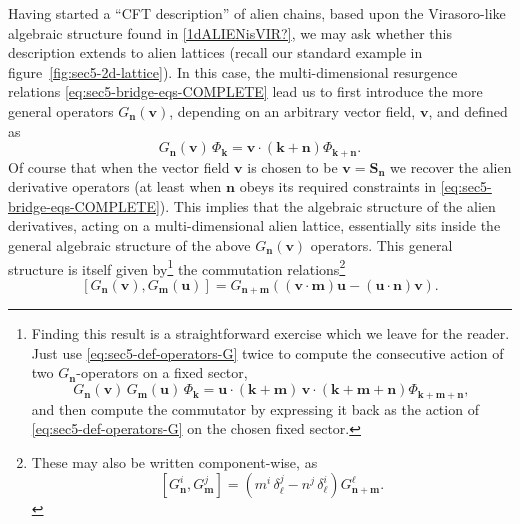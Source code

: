 \documentclass[11pt,a4paper]{article}
\newcommand{\be}{\begin{equation}}
\newcommand{\ee}{\end{equation}}
\begin{document}
Having started a ``CFT description'' of alien chains, based upon the Virasoro-like algebraic structure found in \eqref{1dALIENisVIR?}, we may ask whether this description extends to alien lattices (recall our standard example in figure~\ref{fig:sec5-2d-lattice}). In this case, the multi-dimensional resurgence relations \eqref{eq:sec5-bridge-eqs-COMPLETE} lead us to first introduce the more general operators $G_{\boldsymbol{n}} (\boldsymbol{v})$, depending on an arbitrary vector field, $\boldsymbol{v}$, and defined as
%
\be
\label{eq:sec5-def-operators-G}
G_{\boldsymbol{n}} (\boldsymbol{v})\, \Phi_{\boldsymbol{k}} = \boldsymbol{v} \cdot  \left( \boldsymbol{k}+\boldsymbol{n} \right) \Phi_{\boldsymbol{k}+\boldsymbol{n}}.
\ee
%
\noindent
Of course that when the vector field $\boldsymbol{v}$ is chosen to be $\boldsymbol{v} = \boldsymbol{S}_{\boldsymbol{n}}$ we recover the alien derivative operators (at least when $\boldsymbol{n}$ obeys its required constraints in \eqref{eq:sec5-bridge-eqs-COMPLETE}). This implies that the algebraic structure of the alien derivatives, acting on a multi-dimensional alien lattice, essentially sits inside the general algebraic structure of the above $G_{\boldsymbol{n}} (\boldsymbol{v})$ operators. This general structure is itself given by\footnote{Finding this result is a straightforward exercise which we leave for the reader. Just use \eqref{eq:sec5-def-operators-G} twice to compute the consecutive action of two $G_{\boldsymbol{n}}$-operators on a fixed sector,
%
\be
G_{\boldsymbol{n}} (\boldsymbol{v})\, G_{\boldsymbol{m}} (\boldsymbol{u})\, \Phi_{\boldsymbol{k}} = \boldsymbol{u} \cdot \left( \boldsymbol{k} + \boldsymbol{m} \right)\, \boldsymbol{v} \cdot \left( \boldsymbol{k} + \boldsymbol{m} + \boldsymbol{n} \right) \Phi_{\boldsymbol{k}+\boldsymbol{m}+\boldsymbol{n}},
\ee
%
\noindent
and then compute the commutator by expressing it back as the action of \eqref{eq:sec5-def-operators-G} on the chosen fixed sector.} the commutation relations\footnote{These may also be written component-wise, as
%
\be
\label{multi-dim-alien-chain-ALG-COMPONENTS}
\left[ G_{\boldsymbol{n}}^i, G_{\boldsymbol{m}}^j \right] = \left( m^i\, \delta^j_{\ell} - n^j\, \delta^i_{\ell} \right) G_{\boldsymbol{n}+\boldsymbol{m}}^{\ell}.
\ee
}
%
\be
\label{multi-dim-alien-chain-ALG}
\left[ G_{\boldsymbol{n}} (\boldsymbol{v}), G_{\boldsymbol{m}} (\boldsymbol{u}) \right] = G_{\boldsymbol{n}+\boldsymbol{m}} \left( \left( \boldsymbol{v} \cdot \boldsymbol{m} \right) \boldsymbol{u} - \left( \boldsymbol{u} \cdot \boldsymbol{n} \right) \boldsymbol{v} \right).
\ee
%
\noindent
\end{document}
